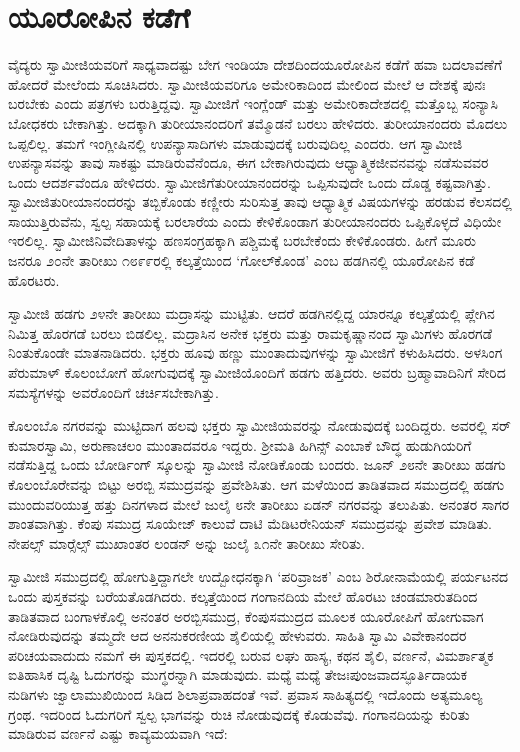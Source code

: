 
\chapter{ಯೂರೋಪಿನ ಕಡೆಗೆ }

 ವೈದ್ಯರು ಸ್ವಾಮೀಜಿಯವರಿಗೆ ಸಾಧ್ಯವಾದಷ್ಟು ಬೇಗ ಇಂಡಿಯಾ ದೇಶದಿಂದ\break ಯೂರೋಪಿನ ಕಡೆಗೆ ಹವಾ ಬದಲಾವಣೆಗೆ ಹೋದರೆ ಮೇಲೆಂದು ಸೂಚಿಸಿದರು. ಸ್ವಾಮೀಜಿಯವರಿಗೂ ಅಮೇರಿಕಾದಿಂದ ಮೇಲಿಂದ ಮೇಲೆ ಆ ದೇಶಕ್ಕೆ ಪುನಃ ಬರಬೇಕು ಎಂದು ಪತ್ರಗಳು ಬರುತ್ತಿದ್ದವು. ಸ್ವಾಮೀಜಿಗೆ ಇಂಗ್ಲೆಂಡ್ ಮತ್ತು ಅಮೇರಿಕಾದೇಶದಲ್ಲಿ ಮತ್ತೊಬ್ಬ ಸಂನ್ಯಾಸಿ ಬೋಧಕರು ಬೇಕಾಗಿತ್ತು. ಅದಕ್ಕಾಗಿ ತುರೀಯಾನಂದರಿಗೆ ತಮ್ಮೊಡನೆ ಬರಲು ಹೇಳಿದರು. ತುರೀಯಾನಂದರು ಮೊದಲು ಒಪ್ಪಲಿಲ್ಲ. ತಮಗೆ ಇಂಗ್ಲೀಷಿನಲ್ಲಿ ಉಪನ್ಯಾಸಾದಿಗಳು ಮಾಡುವುದಕ್ಕೆ ಬರುವುದಿಲ್ಲ ಎಂದರು. ಆಗ ಸ್ವಾಮೀಜಿ ಉಪನ್ಯಾಸವನ್ನು ತಾವು ಸಾಕಷ್ಟು ಮಾಡಿರುವೆನೆಂದೂ, ಈಗ ಬೇಕಾಗಿರುವುದು ಆಧ್ಯಾತ್ಮಿಕ\break ಜೀವನವನ್ನು ನಡೆಸುವವರ ಒಂದು ಆದರ್ಶವೆಂದೂ ಹೇಳಿದರು. ಸ್ವಾಮೀಜಿಗೆ\break ತುರೀಯಾನಂದರನ್ನು ಒಪ್ಪಿಸುವುದೇ ಒಂದು ದೊಡ್ಡ ಕಷ್ಟವಾಗಿತ್ತು. ಸ್ವಾಮೀಜಿ\break ತುರೀಯಾನಂದರನ್ನು ತಬ್ಬಿಕೊಂಡು ಕಣ್ಣೀರು ಸುರಿಸುತ್ತ ತಾವು ಆಧ್ಯಾತ್ಮಿಕ ವಿಷಯಗಳನ್ನು ಹರಡುವ ಕೆಲಸದಲ್ಲಿ ಸಾಯುತ್ತಿರುವೆನು, ಸ್ವಲ್ಪ ಸಹಾಯಕ್ಕೆ ಬರಲಾರೆಯ ಎಂದು ಕೇಳಿಕೊಂಡಾಗ ತುರೀಯಾನಂದರು ಒಪ್ಪಿಕೊಳ್ಳದೆ ವಿಧಿಯೇ ಇರಲಿಲ್ಲ. ಸ್ವಾಮೀಜಿ\break ನಿವೇದಿತಾಳನ್ನು ಹಣಸಂಗ್ರಹಕ್ಕಾಗಿ ಪಶ್ಚಿಮಕ್ಕೆ ಬರಬೇಕೆಂದು ಕೇಳಿಕೊಂಡರು. ಹೀಗೆ ಮೂರು ಜನರೂ ೨೦ನೇ ತಾರೀಖು ೧೮೯೯ರಲ್ಲಿ ಕಲ್ಕತ್ತೆಯಿಂದ ‘ಗೋಲ್‍ಕೊಂಡ’ ಎಂಬ ಹಡಗಿನಲ್ಲಿ ಯೂರೋಪಿನ ಕಡೆ ಹೊರಟರು. 

 ಸ್ವಾಮೀಜಿ ಹಡಗು ೨೪ನೇ ತಾರೀಖು ಮದ್ರಾಸನ್ನು ಮುಟ್ಟಿತು. ಆದರೆ ಹಡಗಿನಲ್ಲಿದ್ದ ಯಾರನ್ನೂ ಕಲ್ಕತ್ತೆಯಲ್ಲಿ ಪ್ಲೇಗಿನ ನಿಮಿತ್ತ ಹೊರಗಡೆ ಬರಲು ಬಿಡಲಿಲ್ಲ. ಮದ್ರಾಸಿನ ಅನೇಕ ಭಕ್ತರು ಮತ್ತು ರಾಮಕೃಷ್ಣಾನಂದ ಸ್ವಾಮಿಗಳು ಹೊರಗಡೆ ನಿಂತುಕೊಂಡೇ ಮಾತನಾಡಿದರು. ಭಕ್ತರು ಹೂವು ಹಣ್ಣು ಮುಂತಾದುವುಗಳನ್ನು ಸ್ವಾಮೀಜಿಗೆ ಕಳುಹಿಸಿದರು. ಅಳಸಿಂಗ ಪೆರುಮಾಳ್ ಕೊಲಂಬೋಗೆ ಹೋಗುವುದಕ್ಕೆ ಸ್ವಾಮೀಜಿಯೊಂದಿಗೆ ಹಡಗು ಹತ್ತಿದರು. ಅವರು ಬ್ರಹ್ಮಾವಾದಿನಿಗೆ ಸೇರಿದ ಸಮಸ್ಯೆಗಳನ್ನು ಅವರೊಂದಿಗೆ ಚರ್ಚಿಸಬೇಕಾಗಿತ್ತು. 

 ಕೊಲಂಬೊ ನಗರವನ್ನು ಮುಟ್ಟಿದಾಗ ಹಲವು ಭಕ್ತರು ಸ್ವಾಮೀಜಿಯವರನ್ನು ನೋಡುವುದಕ್ಕೆ ಬಂದಿದ್ದರು. ಅವರಲ್ಲಿ ಸರ್ ಕುಮಾರಸ್ವಾಮಿ, ಅರುಣಾಚಲಂ ಮುಂತಾದವರೂ ಇದ್ದರು. ಶ‍್ರೀಮತಿ ಹಿಗಿನ್ಸ್ ಎಂಬಾಕೆ ಬೌದ್ಧ ಹುಡುಗಿಯರಿಗೆ ನಡೆಸುತ್ತಿದ್ದ ಒಂದು ಬೋರ್ಡಿಂಗ್ ಸ್ಕೂಲನ್ನು ಸ್ವಾಮೀಜಿ ನೋಡಿಕೊಂಡು ಬಂದರು. ಜೂನ್ ೨೮ನೇ ತಾರೀಖು ಹಡಗು ಕೊಲಂಬೊರೇವನ್ನು ಬಿಟ್ಟು ಅರಬ್ಬಿ ಸಮುದ್ರವನ್ನು ಪ್ರವೇಶಿಸಿತು. ಆಗ ಮಳೆಯಿಂದ ತಾಡಿತವಾದ ಸಮುದ್ರದಲ್ಲಿ ಹಡಗು ಮುಂದುವರಿಯುತ್ತ ಹತ್ತು ದಿನಗಳಾದ ಮೇಲೆ ಜುಲೈ ೮ನೇ ತಾರೀಖು ಏಡನ್ ನಗರವನ್ನು ತಲುಪಿತು. ಅನಂತರ ಸಾಗರ ಶಾಂತವಾಗಿತ್ತು. ಕೆಂಪು ಸಮುದ್ರ ಸೂಯೇಜ್ ಕಾಲುವೆ ದಾಟಿ ಮೆಡಿಟರೇನಿಯನ್ ಸಮುದ್ರವನ್ನು ಪ್ರವೇಶ ಮಾಡಿತು. ನೇಪಲ್ಸ್ ಮಾರ್‍ಸೆಲ್ಸ್ ಮುಖಾಂತರ ಲಂಡನ್ ಅನ್ನು ಜುಲೈ ೩೧ನೇ ತಾರೀಖು ಸೇರಿತು. 

 ಸ್ವಾಮೀಜಿ ಸಮುದ್ರದಲ್ಲಿ ಹೋಗುತ್ತಿದ್ದಾಗಲೇ ಉದ್ಬೋಧನಕ್ಕಾಗಿ ‘ಪರಿವ್ರಾಜಕ’ ಎಂಬ ಶಿರೋನಾಮೆಯಲ್ಲಿ ಪರ್ಯಟನದ ಒಂದು ಪುಸ್ತಕವನ್ನು ಬರೆಯತೊಡಗಿದರು. ಕಲ್ಕತ್ತೆಯಿಂದ ಗಂಗಾನದಿಯ ಮೇಲೆ ಹೊರಟು ಚಂಡಮಾರುತದಿಂದ ತಾಡಿತವಾದ ಬಂಗಾಳಕೊಲ್ಲಿ ಅನಂತರ ಅರಬ್ಬಿಸಮುದ್ರ, ಕೆಂಪುಸಮುದ್ರದ ಮೂಲಕ ಯೂರೋಪಿಗೆ ಹೋಗುವಾಗ ನೋಡಿರುವುದನ್ನು ತಮ್ಮದೇ ಆದ ಅನನುಕರಣೀಯ ಶೈಲಿಯಲ್ಲಿ ಹೇಳುವರು. ಸಾಹಿತಿ ಸ್ವಾಮಿ ವಿವೇಕಾನಂದರ ಪರಿಚಯವಾದುದು ನಮಗೆ ಈ ಪುಸ್ತಕದಲ್ಲಿ. ಇದರಲ್ಲಿ ಬರುವ ಲಘು ಹಾಸ್ಯ, ಕಥನ ಶೈಲಿ, ವರ್ಣನೆ, ವಿಮರ್ಶಾತ್ಮಕ ಐತಿಹಾಸಿಕ ದೃಷ್ಟಿ ಓದುಗರನ್ನು ಮುಗ್ಧರನ್ನಾಗಿ ಮಾಡುವುದು. ಮಧ್ಯೆ ಮಧ್ಯೆ ತೇಜಃಪುಂಜವಾದ\break ಸ್ಫೂರ್ತಿದಾಯಕ ನುಡಿಗಳು ಜ್ವಾಲಾಮುಖಿಯಿಂದ ಸಿಡಿದ ಶಿಲಾಪ್ರವಾಹದಂತೆ ಇವೆ. ಪ್ರವಾಸ ಸಾಹಿತ್ಯದಲ್ಲಿ ಇದೊಂದು ಅತ್ಯಮೂಲ್ಯ ಗ್ರಂಥ. ಇದರಿಂದ ಓದುಗರಿಗೆ ಸ್ವಲ್ಪ ಭಾಗವನ್ನು ರುಚಿ ನೋಡುವುದಕ್ಕೆ ಕೊಡುವೆವು. ಗಂಗಾನದಿಯನ್ನು ಕುರಿತು ಮಾಡಿರುವ ವರ್ಣನೆ ಎಷ್ಟು ಕಾವ್ಯಮಯವಾಗಿ ಇದೆ: 

